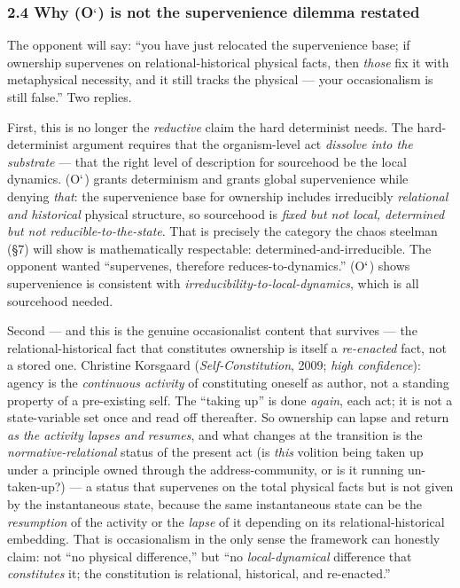 \documentclass[11pt]{article}
\begin{document}
\subsubsection*{2.4 Why (O\ensuremath{`}) is not the supervenience dilemma restated}

The opponent will say: ``you have just relocated the supervenience base; if ownership supervenes on relational-historical physical facts, then \emph{those} fix it with metaphysical necessity, and it still tracks the physical — your occasionalism is still false.'' Two replies.

First, this is no longer the \emph{reductive} claim the hard determinist needs. The hard-determinist argument requires that the organism-level act \emph{dissolve into the substrate} — that the right level of description for sourcehood be the local dynamics. (O\ensuremath{`}) grants determinism and grants global supervenience while denying \emph{that}: the supervenience base for ownership includes irreducibly \emph{relational and historical} physical structure, so sourcehood is \emph{fixed but not local, determined but not reducible-to-the-state}. That is precisely the category the chaos steelman (§7) will show is mathematically respectable: determined-and-irreducible. The opponent wanted ``supervenes, therefore reduces-to-dynamics.'' (O\ensuremath{`}) shows supervenience is consistent with \emph{irreducibility-to-local-dynamics}, which is all sourcehood needed.

Second — and this is the genuine occasionalist content that survives — the relational-historical fact that constitutes ownership is itself a \emph{re-enacted} fact, not a stored one. Christine Korsgaard (\emph{Self-Constitution}, 2009; \emph{high confidence}): agency is the \emph{continuous activity} of constituting oneself as author, not a standing property of a pre-existing self. The ``taking up'' is done \emph{again}, each act; it is not a state-variable set once and read off thereafter. So ownership can lapse and return \emph{as the activity lapses and resumes}, and what changes at the transition is the \emph{normative-relational} status of the present act (is \emph{this} volition being taken up under a principle owned through the address-community, or is it running un-taken-up?) — a status that supervenes on the total physical facts but is not given by the instantaneous state, because the same instantaneous state can be the \emph{resumption} of the activity or the \emph{lapse} of it depending on its relational-historical embedding. That is occasionalism in the only sense the framework can honestly claim: not ``no physical difference,'' but ``no \emph{local-dynamical} difference that \emph{constitutes} it; the constitution is relational, historical, and re-enacted.''
\end{document}
